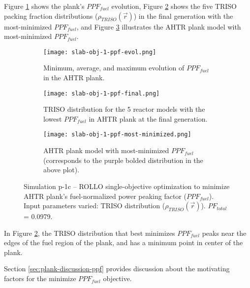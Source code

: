 Figure \ref{fig:slab-obj-1-ppf-evol} shows the plank's $PPF_{fuel}$ evolution, 
Figure \ref{fig:slab-obj-1-ppf-final} shows the five \gls{TRISO} 
packing fraction distributions ($\rho_{TRISO}(\vec{r})$) in the final generation 
with the most-minimized $PPF_{fuel}$, and Figure 
\ref{fig:slab-obj-1-ppf-most-minimized} illustrates the \gls{AHTR} plank model with 
most-minimized $PPF_{fuel}$. 
\begin{figure}[htbp!]
    \centering
    \begin{subfigure}{0.9\textwidth}
        \texttt{[image: slab-obj-1-ppf-evol.png]}
        \caption{Minimum, average, and maximum evolution of $PPF_{fuel}$ in the 
        AHTR plank.}
        \label{fig:slab-obj-1-ppf-evol} 
    \end{subfigure}
    \begin{subfigure}{0.9\textwidth}
        \texttt{[image: slab-obj-1-ppf-final.png]}
        \caption{TRISO distribution for the 5 reactor models with the 
        lowest $PPF_{fuel}$ in AHTR plank at the final generation.}
        \label{fig:slab-obj-1-ppf-final} 
    \end{subfigure}
    \begin{subfigure}{0.9\textwidth}
        \texttt{[image: slab-obj-1-ppf-most-minimized.png]}
        \caption{\gls{AHTR} plank model with most-minimized $PPF_{fuel}$
        (corresponds to the purple bolded distribution in the above plot).}
        \label{fig:slab-obj-1-ppf-most-minimized} 
    \end{subfigure}
    \caption{Simulation p-1c -- ROLLO single-objective optimization to minimize 
    AHTR plank's fuel-normalized power peaking factor ($PPF_{fuel}$). 
    Input parameters varied: TRISO distribution ($\rho_{TRISO}(\vec{r})$).
    $PF_{total}$ = 0.0979.}
    \label{fig:slab-obj-1-ppf}
\end{figure}

In Figure \ref{fig:slab-obj-1-ppf-final}, the TRISO distribution that best minimizes 
$PPF_{fuel}$ peaks near the edges of the fuel region of the plank, and has a minimum 
point in center of the plank.

Section \ref{sec:plank-discussion-ppf} provides discussion about the motivating factors 
for the minimize $PPF_{fuel}$ objective. 

